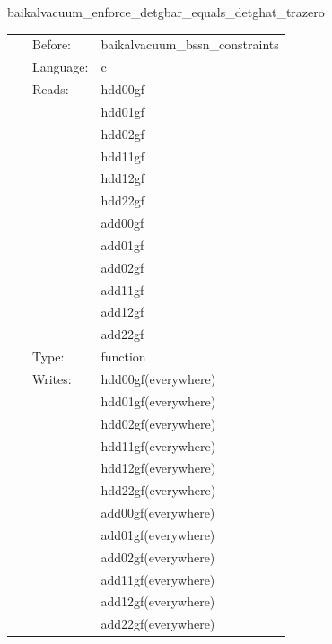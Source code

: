 \vspace{5mm}


\hspace{5mm} baikalvacuum\_enforce\_detgbar\_equals\_detghat\_trazero 

\hspace{5mm}{\it project bssn/fccz4 state before pseudo-evolution routines } 


\hspace{5mm}

 \begin{tabular*}{160mm}{cll} 
~ & Before:  & baikalvacuum\_bssn\_constraints \\ 
~ & Language:  & c \\ 
~ & Reads:  & hdd00gf \\ 
~& ~ &hdd01gf\\ 
~& ~ &hdd02gf\\ 
~& ~ &hdd11gf\\ 
~& ~ &hdd12gf\\ 
~& ~ &hdd22gf\\ 
~& ~ &add00gf\\ 
~& ~ &add01gf\\ 
~& ~ &add02gf\\ 
~& ~ &add11gf\\ 
~& ~ &add12gf\\ 
~& ~ &add22gf\\ 
~ & Type:  & function \\ 
~ & Writes:  & hdd00gf(everywhere) \\ 
~& ~ &hdd01gf(everywhere)\\ 
~& ~ &hdd02gf(everywhere)\\ 
~& ~ &hdd11gf(everywhere)\\ 
~& ~ &hdd12gf(everywhere)\\ 
~& ~ &hdd22gf(everywhere)\\ 
~& ~ &add00gf(everywhere)\\ 
~& ~ &add01gf(everywhere)\\ 
~& ~ &add02gf(everywhere)\\ 
~& ~ &add11gf(everywhere)\\ 
~& ~ &add12gf(everywhere)\\ 
~& ~ &add22gf(everywhere)\\ 
\end{tabular*} 


\vspace{5mm}


